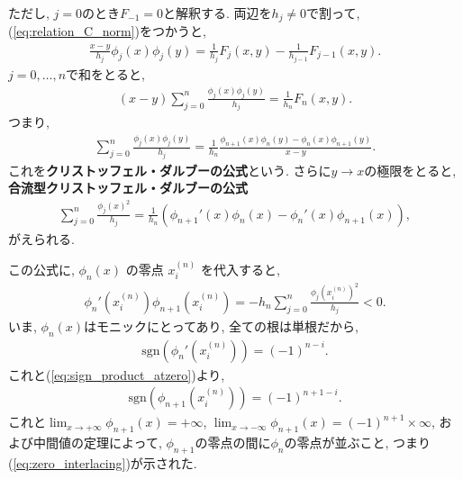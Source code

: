 \documentclass{ltjsarticle}
\theoremstyle{definition}
\begin{document}
ただし, $j=0$のとき$F_{-1}=0$と解釈する. 両辺を$h_j\ne0$で割って, (\ref{eq:relation_C_norm})をつかうと,
\begin{align}
  \frac{x - y}{h_j} \phi_j(x)\phi_j(y) = \frac{1}{h_j} F_j(x, y) - \frac{1}{h_{j-1}} F_{j-1}(x, y).
\end{align}
$j=0,\dots,n$で和をとると,
\begin{align}
  (x - y) \sum_{j=0}^{n} \frac{\phi_j(x)\phi_j(y)}{h_j} = \frac{1}{h_n} F_n(x, y).
\end{align}
つまり,
\begin{align}
  \sum_{j=0}^{n} \frac{\phi_j(x)\phi_j(y)}{h_j} = \frac{1}{h_n} \frac{\phi_{n+1}(x)\phi_n(y) - \phi_n(x)\phi_{n+1}(y)}{x - y}.
\end{align}
これを\textbf{クリストッフェル・ダルブーの公式}という. さらに$y\to x$の極限をとると, \textbf{合流型クリストッフェル・ダルブーの公式}
\begin{align}
  \sum_{j=0}^{n} \frac{\phi_j(x)^2}{h_j} = \frac{1}{h_n} \left( \phi_{n+1}'(x)\phi_n(x) - \phi_n'(x)\phi_{n+1}(x) \right),
\end{align}
がえられる.

この公式に, $\phi_n(x)$ の零点 $x_i^{(n)}$ を代入すると,
\begin{align}
   \phi_n'(x_i^{(n)})\phi_{n+1}(x_i^{(n)}) = - h_n \sum_{j=0}^{n} \frac{\phi_j(x_i^{(n)})^2}{h_j} < 0.\label{eq:sign_product_atzero}
\end{align}
いま, $\phi_n(x)$はモニックにとってあり, 全ての根は単根だから,
\begin{align}
  \text{sgn}(\phi_n'(x_i^{(n)})) = (-1)^{n-i}.
\end{align}
これと(\ref{eq:sign_product_atzero})より,
\begin{align}
  \text{sgn}(\phi_{n+1}(x_i^{(n)})) = (-1)^{n+1-i}.
\end{align}
これと$\lim_{x\to+\infty}\phi_{n+1}(x)=+\infty$, $\lim_{x\to-\infty}\phi_{n+1}(x)=(-1)^{n+1}\times\infty$, および中間値の定理によって, $\phi_{n+1}$の零点の間に$\phi_n$の零点が並ぶこと, つまり(\ref{eq:zero_interlacing})が示された.
\end{document}
